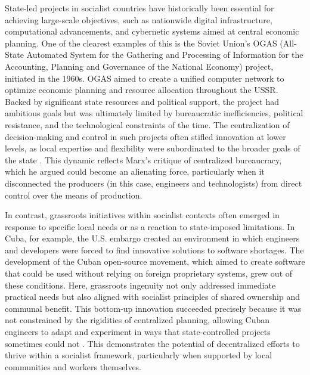 \begin{refsection}
State-led projects in socialist countries have historically been essential for achieving large-scale objectives, such as nationwide digital infrastructure, computational advancements, and cybernetic systems aimed at central economic planning. One of the clearest examples of this is the Soviet Union's OGAS (All-State Automated System for the Gathering and Processing of Information for the Accounting, Planning and Governance of the National Economy) project, initiated in the 1960s. OGAS aimed to create a unified computer network to optimize economic planning and resource allocation throughout the USSR. Backed by significant state resources and political support, the project had ambitious goals but was ultimately limited by bureaucratic inefficiencies, political resistance, and the technological constraints of the time. The centralization of decision-making and control in such projects often stifled innovation at lower levels, as local expertise and flexibility were subordinated to the broader goals of the state \cite[pp.~164-172]{gerovitch2004}. This dynamic reflects Marx’s critique of centralized bureaucracy, which he argued could become an alienating force, particularly when it disconnected the producers (in this case, engineers and technologists) from direct control over the means of production.

In contrast, grassroots initiatives within socialist contexts often emerged in response to specific local needs or as a reaction to state-imposed limitations. In Cuba, for example, the U.S. embargo created an environment in which engineers and developers were forced to find innovative solutions to software shortages. The development of the Cuban open-source movement, which aimed to create software that could be used without relying on foreign proprietary systems, grew out of these conditions. Here, grassroots ingenuity not only addressed immediate practical needs but also aligned with socialist principles of shared ownership and communal benefit. This bottom-up innovation succeeded precisely because it was not constrained by the rigidities of centralized planning, allowing Cuban engineers to adapt and experiment in ways that state-controlled projects sometimes could not \cite[pp.~87-90]{kapcia2008}. This demonstrates the potential of decentralized efforts to thrive within a socialist framework, particularly when supported by local communities and workers themselves.


\end{refsection}
